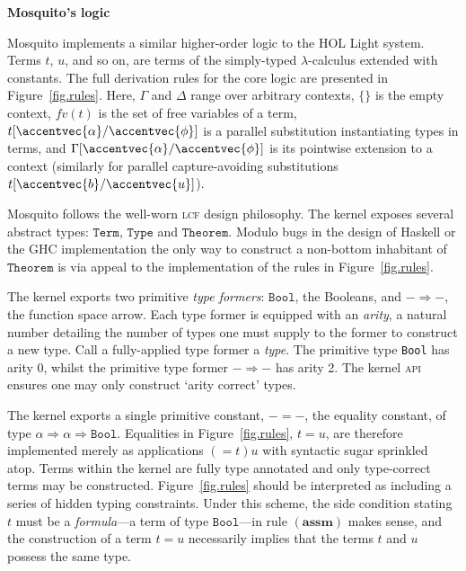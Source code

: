 \documentclass{llncs}
\let\vec\accentvec
\newcommand{\mosquito}{Mosquito\xspace}
\newcommand{\rulefont}[1]{\ensuremath{(\mathbf{#1})}}
\begin{document}
\noindent\newline
\textbf{Mosquito's logic}
\newline

\mosquito implements a similar higher-order logic to the HOL Light system.
Terms $t$, $u$, and so on, are terms of the simply-typed $\lambda$-calculus extended with constants.
The full derivation rules for the core logic are presented in Figure~\ref{fig.rules}.
Here, $\Gamma$ and $\Delta$ range over arbitrary contexts, $\{\}$ is the empty context, $fv(t)$ is the set of free variables of a term, $t[\vec{\alpha}/\vec{\phi}]$ is a parallel substitution instantiating types in terms, and $\Gamma[\vec{\alpha}/\vec{\phi}]$ is its pointwise extension to a context (similarly for parallel capture-avoiding substitutions $t[\vec{b}/\vec{u}]$).

\mosquito follows the well-worn \textsc{lcf} design philosophy.
The kernel exposes several abstract types: $\mathtt{Term}$, $\mathtt{Type}$ and $\mathtt{Theorem}$.
Modulo bugs in the design of Haskell or the GHC implementation the only way to construct a non-bottom inhabitant of $\mathtt{Theorem}$ is via appeal to the implementation of the rules in Figure~\ref{fig.rules}.

The kernel exports two primitive \emph{type formers}: $\mathtt{Bool}$, the Booleans, and $- \Rightarrow -$, the function space arrow.
Each type former is equipped with an \emph{arity}, a natural number detailing the number of types one must supply to the former to construct a new type.
Call a fully-applied type former a \emph{type}.
The primitive type \texttt{Bool} has arity 0, whilst the primitive type former $- \Rightarrow -$ has arity 2.
The kernel \textsc{api} ensures one may only construct `arity correct' types.

The kernel exports a single primitive constant, $- = -$, the equality constant, of type $\alpha \Rightarrow \alpha \Rightarrow \mathtt{Bool}$.
Equalities in Figure~\ref{fig.rules}, $t = u$, are therefore implemented merely as applications $(= t) u$ with syntactic sugar sprinkled atop.
Terms within the kernel are fully type annotated and only type-correct terms may be constructed.
Figure~\ref{fig.rules} should be interpreted as including a series of hidden typing constraints.
Under this scheme, the side condition stating $t$ must be a \emph{formula}---a term of type $\mathtt{Bool}$---in rule \rulefont{assm} makes sense, and the construction of a term $t = u$ necessarily implies that the terms $t$ and $u$ possess the same type.
\end{document}
